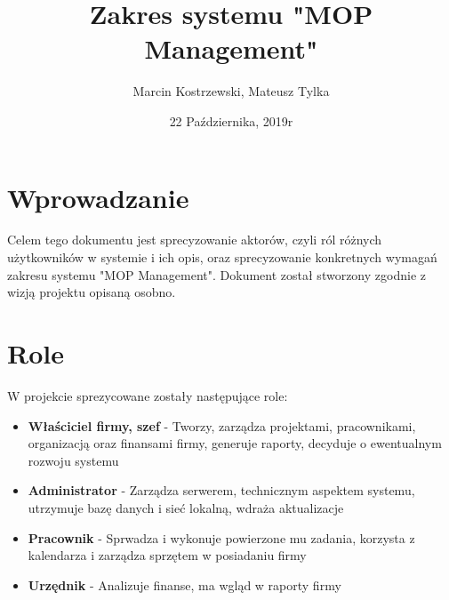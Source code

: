 \documentclass{article}
\title{Zakres systemu "MOP Management"}
\author{Marcin Kostrzewski, Mateusz Tylka}
\date{22 Października, 2019r}
\begin{document}
\maketitle
\newpage
\tableofcontents
\newpage

\section{Wprowadzanie}
Celem tego dokumentu jest sprecyzowanie aktorów, czyli ról różnych
użytkowników w systemie i ich opis, oraz sprecyzowanie konkretnych 
wymagań zakresu systemu "MOP Management". Dokument został stworzony
zgodnie z wizją projektu opisaną osobno.

\section{Role}
W projekcie sprezycowane zostały następujące role:
\begin{itemize}
    \item \textbf{Właściciel firmy, szef} - Tworzy, zarządza projektami, pracownikami, organizacją oraz finansami firmy, generuje raporty, decyduje o ewentualnym rozwoju systemu
    \item \textbf{Administrator} - Zarządza serwerem, technicznym aspektem systemu, utrzymuje bazę danych i sieć lokalną, wdraża aktualizacje
    \item \textbf{Pracownik} - Sprwadza i wykonuje powierzone mu zadania, korzysta z kalendarza i zarządza sprzętem w posiadaniu firmy
    \item \textbf{Urzędnik} - Analizuje finanse, ma wgląd w raporty firmy
\end{itemize}
\end{document}
